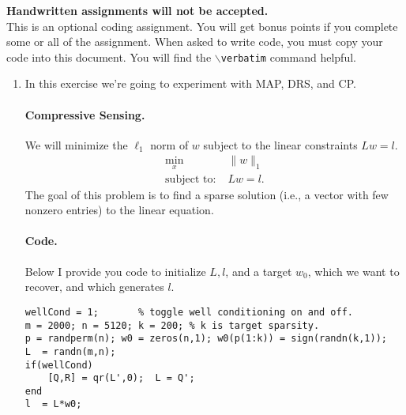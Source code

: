 \documentclass[11pt]{article}
\begin{document}
\newcommand{\Tcp}{T_{\mathrm{CP}}}
\newcommand{\Fix}{\mathrm{Fix}}

{\huge \textbf{Handwritten assignments will not be accepted.}}\\

This is an optional coding assignment. You will get bonus points if you complete some or all of the assignment. When asked to write code, you must copy your code into this document. You will find the \texttt{$\backslash$verbatim} command helpful.


\begin{enumerate}

\item In this exercise we're going to experiment with MAP, DRS, and CP. 

\paragraph{Compressive Sensing.} We will minimize the $\ell_1$ norm of $w$ subject to the linear constraints $Lw = l$.
\begin{align*}
\min_x & \; \|w\|_1 \\
\text{subject to:} &\; Lw = l.
\end{align*}
The goal of this problem is to find a sparse solution (i.e., a vector with few nonzero entries) to the linear equation.

\paragraph{Code.} Below I provide you code to initialize $L, l$, and a target $w_0$, which we want to recover, and which generates $l$. 

\begin{verbatim}
wellCond = 1; 		% toggle well conditioning on and off.
m = 2000; n = 5120; k = 200; % k is target sparsity.
p = randperm(n); w0 = zeros(n,1); w0(p(1:k)) = sign(randn(k,1));
L  = randn(m,n);
if(wellCond)
    [Q,R] = qr(L',0);  L = Q';
end
l  = L*w0;
\end{verbatim}



\end{enumerate}
\end{document}
